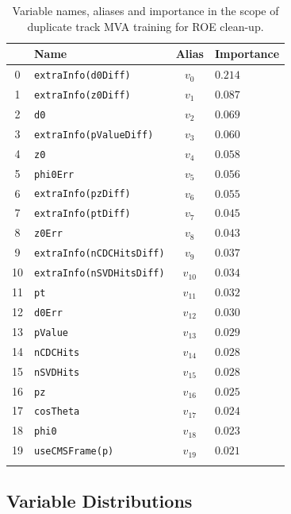 \begin{longtable}{c|l|c|l}
& Name & Alias & Importance \\
\toprule 
0 &\texttt{\footnotesize extraInfo(d0Diff)} & $v_{0}$ & $0.214$ \\ 
1 &\texttt{\footnotesize extraInfo(z0Diff)} & $v_{1}$ & $0.087$ \\ 
2 &\texttt{\footnotesize d0} & $v_{2}$ & $0.069$ \\ 
3 &\texttt{\footnotesize extraInfo(pValueDiff)} & $v_{3}$ & $0.060$ \\ 
4 &\texttt{\footnotesize z0} & $v_{4}$ & $0.058$ \\ 
5 &\texttt{\footnotesize phi0Err} & $v_{5}$ & $0.056$ \\ 
6 &\texttt{\footnotesize extraInfo(pzDiff)} & $v_{6}$ & $0.055$ \\ 
7 &\texttt{\footnotesize extraInfo(ptDiff)} & $v_{7}$ & $0.045$ \\ 
8 &\texttt{\footnotesize z0Err} & $v_{8}$ & $0.043$ \\ 
9 &\texttt{\footnotesize extraInfo(nCDCHitsDiff)} & $v_{9}$ & $0.037$ \\ 
10 &\texttt{\footnotesize extraInfo(nSVDHitsDiff)} & $v_{10}$ & $0.034$ \\ 
11 &\texttt{\footnotesize pt} & $v_{11}$ & $0.032$ \\ 
12 &\texttt{\footnotesize d0Err} & $v_{12}$ & $0.030$ \\ 
13 &\texttt{\footnotesize pValue} & $v_{13}$ & $0.029$ \\ 
14 &\texttt{\footnotesize nCDCHits} & $v_{14}$ & $0.028$ \\ 
15 &\texttt{\footnotesize nSVDHits} & $v_{15}$ & $0.028$ \\ 
16 &\texttt{\footnotesize pz} & $v_{16}$ & $0.025$ \\ 
17 &\texttt{\footnotesize cosTheta} & $v_{17}$ & $0.024$ \\ 
18 &\texttt{\footnotesize phi0} & $v_{18}$ & $0.023$ \\ 
19 &\texttt{\footnotesize useCMSFrame(p)} & $v_{19}$ & $0.021$ \\ 
\bottomrule
\captionsetup{width=0.8\linewidth}
\caption{Variable names, aliases and importance in the scope of duplicate track MVA training for ROE clean-up.}
\end{longtable}


\subsection{Variable Distributions}


